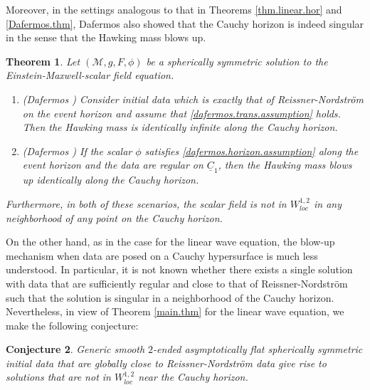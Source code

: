 \documentclass[12 pt, reqno]{amsart}
\newtheorem{theorem}{Theorem}[section]
\newtheorem{conjecture}[theorem]{Conjecture}
\theoremstyle{definition}
\theoremstyle{remark}
\numberwithin{equation}{section}
\newcommand{\0}{\emptyset}
\begin{document}
Moreover, in the settings analogous to that in Theorems \ref{thm.linear.hor} and \ref{Dafermos.thm}, Dafermos also showed that the Cauchy horizon is indeed singular in the sense that the Hawking mass blows up. 
\begin{theorem}
Let $(\mathcal M, g, F,\phi)$ be a spherically symmetric solution to the Einstein-Maxwell-scalar field equation.
\begin{enumerate}
\item (Dafermos \cite{D1}) Consider initial data which is exactly that of Reissner-Nordstr\"om on the event horizon and assume that \eqref{dafermos.trans.assumption} holds. Then the Hawking mass is identically infinite along the Cauchy horizon.
\item (Dafermos \cite{D3}) If the scalar $\phi$ satisfies \eqref{dafermos.horizon.assumption} along the event horizon and the data are regular on $\underline C_1$, then the Hawking mass blows up identically along the Cauchy horizon.
\end{enumerate}
Furthermore, in both of these scenarios, the scalar field is not in $W^{1,2}_{loc}$ in any neighborhood of any point on the Cauchy horizon.
\end{theorem}


On the other hand, as in the case for the linear wave equation, the blow-up mechanism when data are posed on a Cauchy hypersurface is much less understood. In particular, it is not known whether there exists a single solution with data that are sufficiently regular and close to that of Reissner-Nordstr\"om such that the solution is singular in a neighborhood of the Cauchy horizon. Nevertheless, in view of Theorem \ref{main.thm} for the linear wave equation, we make the following conjecture:
\begin{conjecture}
Generic smooth $2$-ended asymptotically flat spherically symmetric initial data that are globally close to Reissner-Nordstr\"om data give rise to solutions that are not in $W^{1,2}_{loc}$ near the Cauchy horizon.
\end{conjecture}
\end{document}

